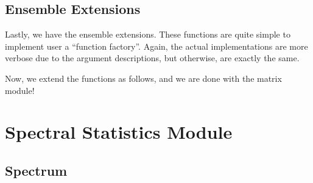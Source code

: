 

\subsection{Ensemble Extensions}

Lastly, we have the ensemble extensions. These functions are quite simple to implement user a ``function factory''. Again, the actual implementations are more verbose due to the argument descriptions, but otherwise, are exactly the same.



Now, we extend the functions as follows, and we are done with the matrix module!



\newpage
\section{Spectral Statistics Module}

\subsection{Spectrum}






